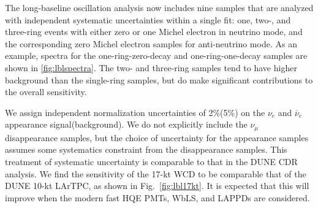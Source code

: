 The long-baseline oscillation analysis now includes nine samples that are analyzed with independent systematic
uncertainties within a single fit: one, two-, and three-ring events with either zero or one Michel electron
in neutrino mode, and the corresponding zero Michel electron samples for anti-neutrino mode. As an example,
spectra for the one-ring-zero-decay and one-ring-one-decay samples are shown in \ref{fig:lblspectra}. The two-
and three-ring samples tend to have higher background than the single-ring samples, but do make significant
contributions to the overall sensitivity.


We assign independent normalization uncertainties of 2\%(5\%) on the $\nu_{e}$ and $\overline{\nu}_{e}$ appearance
signal(background). We do not explicitly include the $\nu_{\mu}$ disappearance samples, but the choice of
uncertainty for the appearance samples assumes some systematics constraint from the disappearance samples.
This treatment of systematic uncertainty is comparable to that in the DUNE CDR analysis. We find the sensitivity
of the 17-kt WCD to be comparable that of the DUNE 10-kt LArTPC, as shown in Fig.~\ref{fig:lbl17kt}.
It is expected that this will improve when the modern fast HQE PMTs, WbLS, and LAPPDs are considered. 

